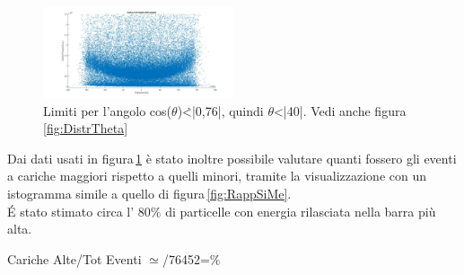 \documentclass[a4paper,twocolumn]{article}
\begin{document}
\begin{figure}[H]
\centering
\includegraphics[width=0.5\textwidth]{./immagini/TimeOfFlight/DipendenzaAngolo.jpg}
\caption{Limiti per l'angolo cos($\theta$)\.<\:|0,76|, quindi $\theta$\:<\:|40|. Vedi anche figura \ref{fig:DistrTheta}}
\label{fig:DipendenzaAngolo}
\end{figure}

Dai dati usati in figura\,\ref{fig:DipendenzaAngolo} è stato inoltre possibile valutare quanti fossero gli eventi a cariche maggiori rispetto a quelli minori, tramite la visualizzazione con un istogramma simile a quello di figura\,\ref{fig:RappSiMe}.\\
\'E stato stimato circa l' 80$\%$ di particelle con energia rilasciata nella barra più alta.
\begin{center}
Cariche Alte/Tot Eventi $\simeq$/76452\:=$\%$ 
\end{center}


\newpage
\end{document}

